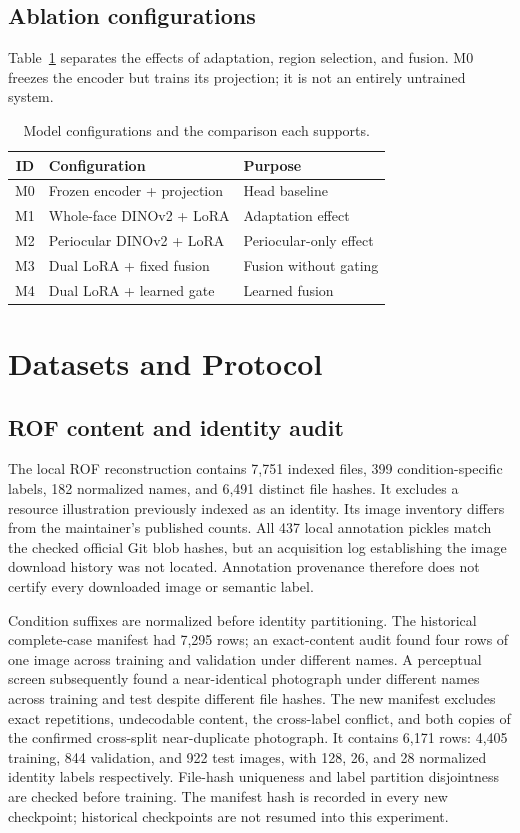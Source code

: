 \documentclass[10pt,journal,compsoc]{IEEEtran}
\begin{document}
\subsection{Ablation configurations}
Table~\ref{tab:ablations} separates the effects of adaptation, region selection, and fusion. M0 freezes the encoder but trains its projection; it is not an entirely untrained system.
\begin{table}[t]
\centering
\caption{Model configurations and the comparison each supports.}
\label{tab:ablations}
\begin{tabular}{cll}
\toprule
ID & Configuration & Purpose\\
\midrule
M0 & Frozen encoder + projection & Head baseline\\
M1 & Whole-face DINOv2 + LoRA & Adaptation effect\\
M2 & Periocular DINOv2 + LoRA & Periocular-only effect\\
M3 & Dual LoRA + fixed fusion & Fusion without gating\\
M4 & Dual LoRA + learned gate & Learned fusion\\
\bottomrule
\end{tabular}
\end{table}


\section{Datasets and Protocol}
\subsection{ROF content and identity audit}
The local ROF reconstruction contains 7,751 indexed files, 399 condition-specific labels, 182 normalized names, and 6,491 distinct file hashes. It excludes a resource illustration previously indexed as an identity. Its image inventory differs from the maintainer's published counts. All 437 local annotation pickles match the checked official Git blob hashes, but an acquisition log establishing the image download history was not located. Annotation provenance therefore does not certify every downloaded image or semantic label.

Condition suffixes are normalized before identity partitioning. The historical complete-case manifest had 7,295 rows; an exact-content audit found four rows of one image across training and validation under different names. A perceptual screen subsequently found a near-identical photograph under different names across training and test despite different file hashes. The new manifest excludes exact repetitions, undecodable content, the cross-label conflict, and both copies of the confirmed cross-split near-duplicate photograph. It contains 6,171 rows: 4,405 training, 844 validation, and 922 test images, with 128, 26, and 28 normalized identity labels respectively. File-hash uniqueness and label partition disjointness are checked before training. The manifest hash is recorded in every new checkpoint; historical checkpoints are not resumed into this experiment.
\end{document}
